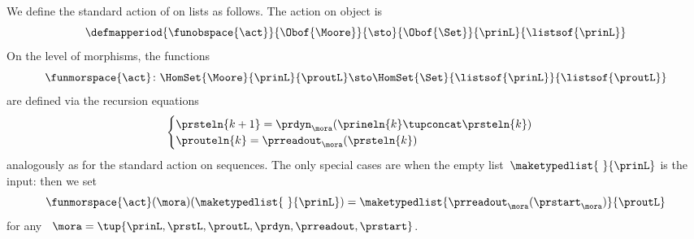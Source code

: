 \begin{definition}
    \label{def:moore-standard-action-on-lists}
    We define the standard action of  on lists as follows.
    The action on object is
    \begin{equation}
        \defmapperiod{\funobspace{\act}}
        {\Obof{\Moore}}
        {\sto}
        {\Obof{\Set}}
        {\prinL}
        {\listsof{\prinL}}
    \end{equation}
    On the level of morphisms, the functions
    \begin{equation}
        \funmorspace{\act} \colon  \HomSet{\Moore}{\prinL}{\proutL} \sto \HomSet{\Set}{ \listsof{\prinL}}{\listsof{\proutL}}
    \end{equation}
    are defined via the recursion equations
    \begin{equation}
        \begin{cases}
            \prsteln{k+1} = \prdyn_\mora(\prineln{k} \tupconcat \prsteln{k}) \\
            \prouteln{k}   = \prreadout_\mora(\prsteln{k})
        \end{cases}
    \end{equation}
    analogously as for the standard action on sequences.
    The only special cases are when the empty list~$\maketypedlist{\ }{\prinL}$ is the input: then we set
    \begin{equation}
        \funmorspace{\act}(\mora)(\maketypedlist{\ }{\prinL}) = \maketypedlist{ \prreadout_\mora(\prstart_\mora) }{\proutL}
    \end{equation}
    for any ~$\mora = \tup{\prinL,\prstL,\proutL,\prdyn,\prreadout,\prstart}$.
\end{definition}

